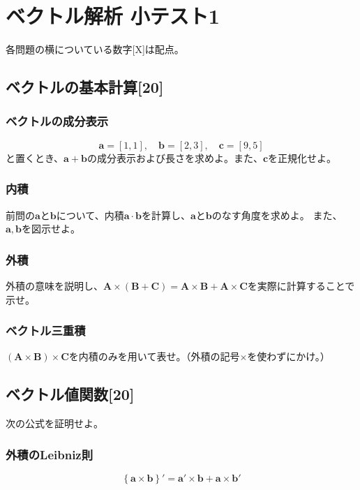 \documentclass[a4j,dvipdfmx]{jsarticle}
\begin{document}
    \section*{ベクトル解析 小テスト1}
        各問題の横についている数字[X]は配点。
        \subsection{ベクトルの基本計算[20]}
            \subsubsection{ベクトルの成分表示}
                \begin{equation*}
                    \bm{a} = [1,1],\quad \bm{b}=[2,3],\quad \bm{c} = [9,5]
                \end{equation*}
                と置くとき、$\bm{a} + \bm{b}$の成分表示および長さを求めよ。また、$\bm{c}$を正規化せよ。
            \subsubsection{内積}
                前問の$\bm{a}$と$\bm{b}$について、内積$\bm{a}\cdot\bm{b}$を計算し、$\bm{a}$と$\bm{b}$のなす角度を求めよ。
                また、$\bm{a},\bm{b}$を図示せよ。
            \subsubsection{外積}
                外積の意味を説明し、$\bm{A}\times (\bm{B} + \bm{C}) = \bm{A}\times \bm{B} + \bm{A} \times\bm{C}$を実際に計算することで示せ。
            \subsubsection{ベクトル三重積}
                $(\bm{A} \times \bm{B})\times \bm{C}$を内積のみを用いて表せ。（外積の記号$\times$を使わずにかけ。）
        \subsection{ベクトル値関数[20]}
            次の公式を証明せよ。
            \subsubsection{外積のLeibniz則}
                \begin{equation*}
                    \left\{\bm{a}\times \bm{b}\right\}' = \bm{a}'\times \bm{b} + \bm{a}\times \bm{b}'
                \end{equation*}
\end{document}
